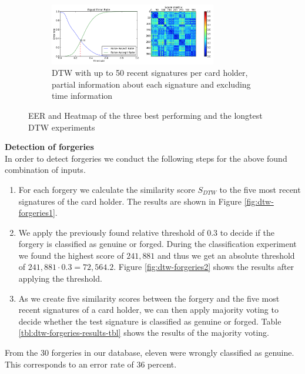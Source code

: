 \documentclass[a4paper, oneside]{csthesis}
\begin{document}
\begin{figure}
        \begin{subfigure}[b]{\textwidth}
                \centering
                \includegraphics[width=0.8\textwidth]{figures/dtw-exp4.png}
                \caption{DTW with up to 50 recent signatures per card holder, partial information about each signature and excluding time information}
                \label{fig:dtw-exp4}
        \end{subfigure}%

        \caption{EER and Heatmap of the three best performing and the longtest DTW experiments}\label{fig:dtw-experiments2}
\end{figure}

\textbf{Detection of forgeries}\\
In order to detect forgeries we conduct the following steps for the above found combination of inputs.

\begin{enumerate}
\item For each forgery we calculate the similarity score $S_{DTW}$ to the five most recent signatures of the card holder. The results are shown in Figure \ref{fig:dtw-forgeries1}.

\item We apply the previously found relative threshold of 0.3 to decide if the forgery is classified as genuine or forged. During the classification experiment we found the highest score of $241,881$ and thus we get an absolute threshold of $241,881 \cdot 0.3 = 72,564.2$. Figure \ref{fig:dtw-forgeries2} shows the results after applying the threshold.

\item As we create five similarity scores between the forgery and the five most recent signatures of a card holder, we can then apply majority voting to decide whether the test signature is classified as genuine or forged. Table \ref{tbl:dtw-forgeries-results-tbl} shows the results of the majority voting.

\end{enumerate}

From the 30 forgeries in our database, eleven were wrongly classified as genuine. This corresponds to an error rate of 36 percent.
\end{document}
